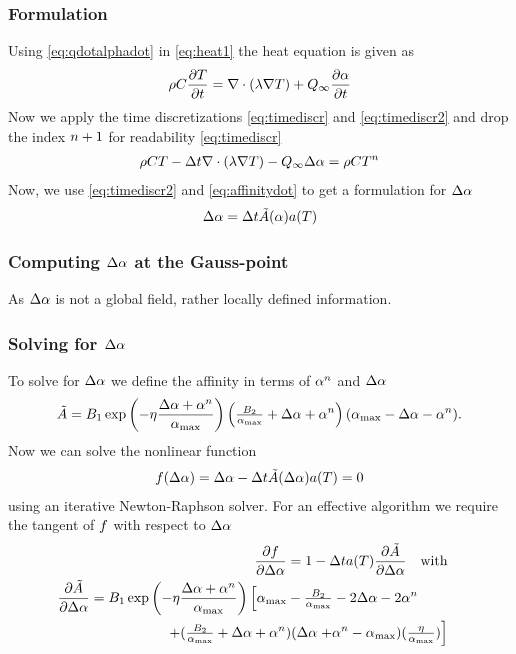 \subsubsection{Formulation}
Using \eqref{eq:qdotalphadot} in \eqref{eq:heat1}
the heat equation is given as
\begin{align}
	\rho C \frac{\partial T}{\partial t} = \nabla \cdot (\lambda \nabla T) + Q_{\infty}\frac{\partial  \alpha}{\partial t} 
\end{align}
Now we apply the time discretizations \eqref{eq:timediscr} and \eqref{eq:timediscr2} and drop the index $n+1$ for readability \eqref{eq:timediscr}
\begin{align}
	\rho C T  - {\Delta t} \nabla \cdot (\lambda \nabla T) - Q_{\infty}\Delta \alpha
	= \rho C T^{n} \label{eq:heat2}
\end{align}
Now, we use \eqref{eq:timediscr2} and \eqref{eq:affinitydot} to get a formulation for $\Delta \alpha$
\begin{align}
	\Delta \alpha = \Delta t \tilde{A}( \alpha)a(T) \label{eq:deltaalpha}
\end{align}
\subsubsection{Computing $\Delta \alpha$ at the Gauss-point}
As $\Delta \alpha$ is not a global field, rather locally defined information.
\subsubsection{Solving for $\Delta \alpha$}
To solve for $\Delta \alpha$ we define the affinity in terms of $ \alpha^{n}$ and $\Delta \alpha$
\begin{align}
	\tilde{A} = B_1\exp\left(-\eta \frac{\Delta \alpha+\alpha^{n}}{\alpha_{\text{max}}}\right) \left(\tfrac{B_2}{\alpha_{\text{max}}} + \Delta\alpha+\alpha^{n}\right) (\alpha_{\text{max}} - \Delta\alpha - \alpha^{n}).
\end{align}
Now we can solve the nonlinear function 
\begin{align}
	f(\Delta\alpha) = \Delta\alpha - \Delta t \tilde{A}(\Delta\alpha)a(T) = 0
\end{align}
using an iterative Newton-Raphson solver. For an effective algorithm we require the tangent of $f$ with respect to $\Delta\alpha$
\begin{align}
	\dfrac{\partial f}{\partial \Delta\alpha} = 1 - \Delta t a(T) \dfrac{\partial\tilde{A}}{\partial \Delta\alpha} \quad\text{with}\\
	\dfrac{\partial\tilde{A}}{\partial \Delta\alpha} = B_1\exp\left(-\eta \frac{\Delta\alpha+\alpha^{n}}{\alpha_{\text{max}}}\right)\left[
	\alpha_{\text{max}} - \tfrac{B_2}{\alpha_{\text{max}}} - 2\Delta\alpha - 2 \alpha^{n}\right.\quad\quad&\nonumber\\
	+ (\tfrac{B_2}{\alpha_{\text{max}}} + \Delta\alpha+\alpha^{n})(\Delta\alpha\left.+ \alpha^{n} - \alpha_{\text{max}})(\tfrac{\eta}{\alpha_{\text{max}}})\right]&
\end{align}
